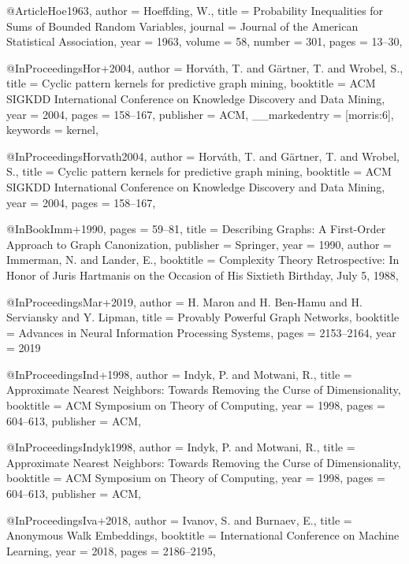 @Article{Hoe1963,
  author  = {Hoeffding, W.},
  title   = {Probability Inequalities for Sums of Bounded Random Variables},
  journal = {Journal of the American Statistical Association},
  year    = {1963},
  volume  = {58},
  number  = {301},
  pages   = {13--30},
}

@InProceedings{Hor+2004,
  author        = {Horv\'{a}th, T. and G\"{a}rtner, T. and Wrobel, S.},
  title         = {Cyclic pattern kernels for predictive graph mining},
  booktitle     = {ACM SIGKDD International Conference on Knowledge Discovery and Data Mining},
  year          = {2004},
  pages         = {158--167},
  publisher     = {ACM},
  __markedentry = {[morris:6]},
  keywords      = {kernel},
}

@InProceedings{Horvath2004,
  author    = {Horv\'{a}th, T. and G\"{a}rtner, T. and Wrobel, S.},
  title     = {Cyclic pattern kernels for predictive graph mining},
  booktitle = {ACM SIGKDD International Conference on Knowledge Discovery and Data Mining},
  year      = {2004},
  pages     = {158--167},
}

@InBook{Imm+1990,
  pages     = {59--81},
  title     = {Describing Graphs: {A} First-Order Approach to Graph Canonization},
  publisher = {Springer},
  year      = {1990},
  author    = {Immerman, N. and Lander, E.},
  booktitle = {Complexity Theory Retrospective: {I}n Honor of Juris Hartmanis on the Occasion of His Sixtieth Birthday, July 5, 1988},
}

@InProceedings{Mar+2019,
author    = {H. Maron and
H. Ben{-}Hamu and
H. Serviansky and
Y. Lipman},
title     = {Provably Powerful Graph Networks},
booktitle = {Advances in Neural Information Processing Systems},
pages     = {2153--2164},
year      = {2019}
}

@InProceedings{Ind+1998,
  author    = {Indyk, P. and Motwani, R.},
  title     = {Approximate Nearest Neighbors: {T}owards Removing the Curse of Dimensionality},
  booktitle = {ACM Symposium on Theory of Computing},
  year      = {1998},
  pages     = {604--613},
  publisher = {{ACM}},
}

@InProceedings{Indyk1998,
  author    = {Indyk, P. and Motwani, R.},
  title     = {Approximate Nearest Neighbors: Towards Removing the Curse of Dimensionality},
  booktitle = {ACM Symposium on Theory of Computing},
  year      = {1998},
  pages     = {604--613},
  publisher = {ACM},
}

@InProceedings{Iva+2018,
  author    = {Ivanov, S. and Burnaev, E.},
  title     = {Anonymous Walk Embeddings},
  booktitle = {International Conference on Machine Learning},
  year      = {2018},
  pages     = {2186--2195},
}

